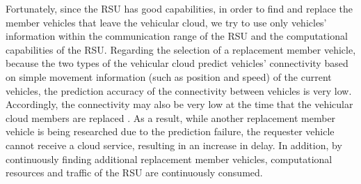 \documentclass[electronics,aricle,accept,pdftex,moreauthors]{Definitions/mdpi}
\begin{document}
Fortunately, since the RSU has good capabilities, in order to find and replace the member vehicles that leave the vehicular cloud, we try to use only vehicles' information within the communication range of the RSU and the computational capabilities of the RSU.
Regarding the selection of a replacement member vehicle, because the two types of the vehicular cloud predict vehicles' connectivity based on simple movement information (such as position and speed) of the current vehicles, the prediction accuracy of the connectivity between vehicles is very low.
Accordingly, the connectivity may also be very low at the time that the vehicular cloud members are replaced \cite{Meneguette2017j}.
As a result, while another replacement member vehicle is being researched due to the prediction failure, the requester vehicle cannot receive a cloud service, resulting in an increase in delay.
In addition, by continuously finding additional replacement member vehicles, computational resources and traffic of the RSU are continuously consumed.
\end{document}
